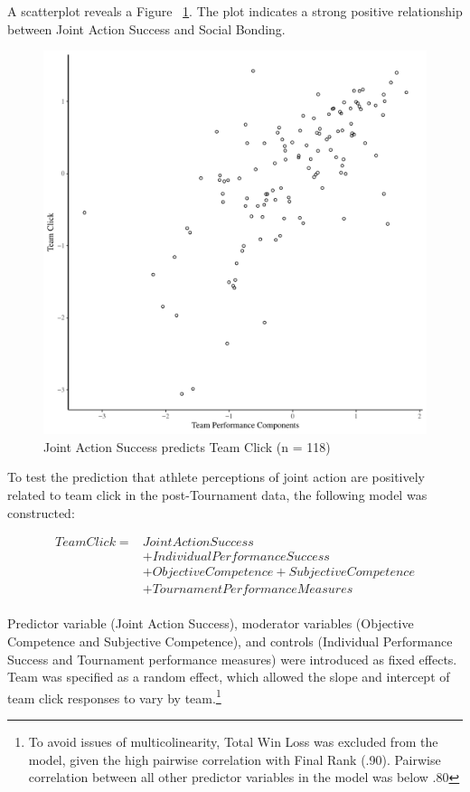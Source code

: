A scatterplot reveals a Figure ~\ref{fig:jasClickBasicXY}. The plot indicates a strong positive relationship between Joint Action Success and Social Bonding.

\begin{figure}[htbp]
  \centering
\includegraphics[scale=.5]{images/jasClickBasicXY.pdf}
  \caption{Joint Action Success predicts Team Click (n = 118)}
  \label{fig:jasClickBasicXY}
\end{figure}


To test the prediction that athlete perceptions of joint action are positively
related to team click in the post-Tournament data, the following model was constructed:


  \begin{align*}
    Team Click =  & Joint Action Success\\
              & + Individual Performance Success \\
              & + Objective Competence + Subjective Competence\\
              & + TournamentPerformanceMeasures \\
  \end{align*}

\bigskip

Predictor variable (Joint Action Success), moderator variables (Objective Competence and Subjective Competence), and controls (Individual Performance Success and Tournament performance measures) were introduced as fixed effects.   Team was specified as a random effect, which allowed the slope and intercept of team click responses to vary by team.\footnote{To avoid issues of multicolinearity, Total Win Loss was excluded from the model, given the high pairwise correlation with Final Rank (.90). Pairwise correlation between all other predictor variables in the model was below .80}

